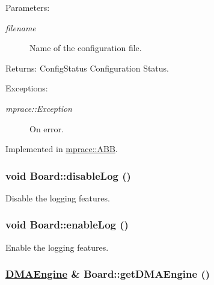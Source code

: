 \begin{Desc}
\item[Parameters:]
\begin{description}
\item[{\em filename}]Name of the configuration file. \end{description}
\end{Desc}
\begin{Desc}
\item[Returns:]Config\-Status Configuration Status. \end{Desc}
\begin{Desc}
\item[Exceptions:]
\begin{description}
\item[{\em mprace::Exception}]On error.\end{description}
\end{Desc}


Implemented in \hyperlink{classmprace_1_1ABB_a12}{mprace::ABB}.\hypertarget{classmprace_1_1Board_a10}{
\subsubsection[disableLog]{\setlength{\rightskip}{0pt plus 5cm}void Board::disable\-Log ()}}
\label{classmprace_1_1Board_a10}


Disable the logging features. 

\hypertarget{classmprace_1_1Board_a9}{
\subsubsection[enableLog]{\setlength{\rightskip}{0pt plus 5cm}void Board::enable\-Log ()}}
\label{classmprace_1_1Board_a9}


Enable the logging features. 

\hypertarget{classmprace_1_1Board_a12}{
\subsubsection[getDMAEngine]{\setlength{\rightskip}{0pt plus 5cm}\hyperlink{classmprace_1_1DMAEngine}{DMAEngine} \& Board::get\-DMAEngine ()}}
\label{classmprace_1_1Board_a12}


